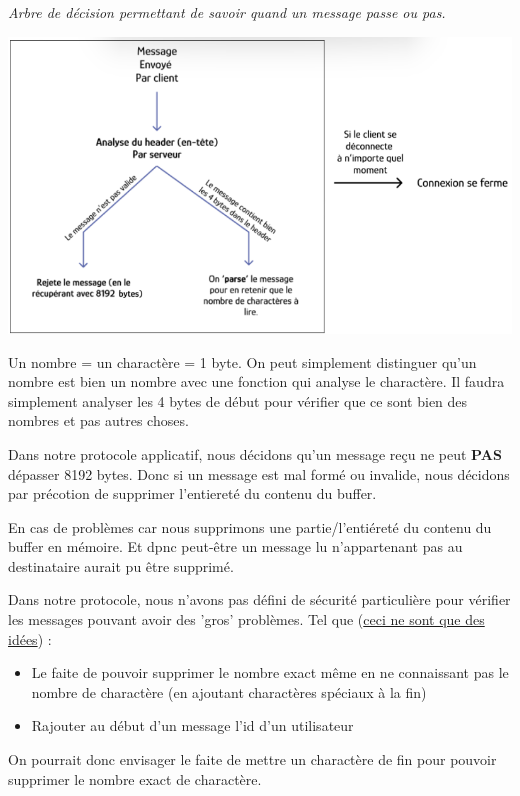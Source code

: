 \textit{Arbre de décision permettant de savoir quand un message passe ou pas.} \\ \par
    {
    \centering
    \includegraphics[width=18cm]{figures/arbre_head_4bytes.png}
    \par
    }

    Un nombre = un charactère = 1 byte. On peut simplement distinguer qu'un nombre est bien un nombre avec une fonction qui analyse le charactère. Il faudra simplement analyser les 4 bytes de début pour vérifier que ce sont bien des nombres et pas autres choses. \\ \par

    Dans notre protocole applicatif, nous décidons qu'un message reçu ne peut \textbf{PAS} dépasser 8192 bytes. Donc si un message est mal formé ou invalide, nous décidons par précotion de supprimer l'entiereté du contenu du buffer. \\ \par

     \par
    En cas de problèmes car nous supprimons une partie/l'entiéreté du contenu du buffer en mémoire. Et dpnc peut-être un message lu n'appartenant pas au destinataire aurait pu être supprimé. \par
    Dans notre protocole, nous n'avons pas défini de sécurité particulière pour vérifier les messages pouvant avoir des 'gros' problèmes. Tel que (\underline{ceci ne sont que des idées}) :
    \begin{itemize}
        \item Le faite de pouvoir supprimer le nombre exact même en ne connaissant pas le nombre de charactère (en ajoutant charactères spéciaux à la fin)
        \item Rajouter au début d'un message l'id d'un utilisateur
    \end{itemize}
    On pourrait donc envisager le faite de mettre un charactère de fin pour pouvoir supprimer le nombre exact de charactère. \\ \\ \par
    

